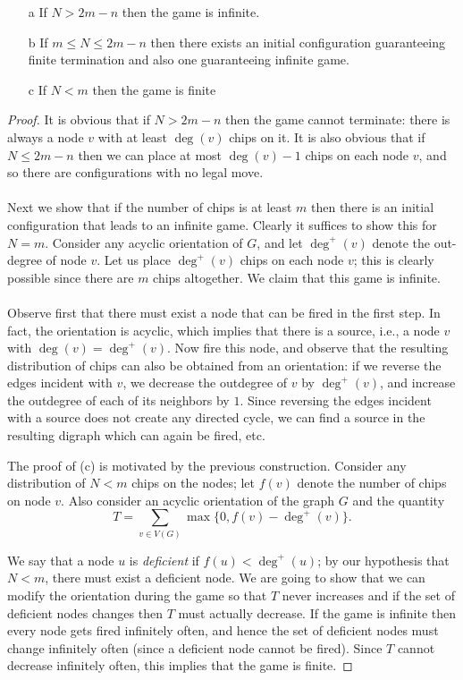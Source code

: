 \sol 

\begin{itemize}
    \item[a] If $N > 2m - n$ then the game is infinite.
    \item[b] If $m \leq N \leq 2m - n$ then there exists an initial configuration guaranteeing finite termination and also one guaranteeing infinite game.
    \item[c] If $N < m$ then the game is finite
\end{itemize}

\begin{proof}
It is obvious that if $N > 2m-n$ then the game cannot terminate: there is always a node $v$ with at least $\deg(v)$ chips on it. It is also obvious that if $N \leq 2m-n$ then we can place at most $\deg(v)-1$ chips on each node $v$, and so there are configurations with no legal move.
\\\\
Next we show that if the number of chips is at least $m$ then there is an initial configuration that leads to an infinite game. Clearly it suffices to show this for $N=m$. Consider any acyclic orientation of $G$, and let $\deg^+(v)$ denote the out-degree of node $v$. Let us place $\deg^+(v)$ chips on each node $v$; this is clearly possible since there are $m$ chips altogether. We claim that this game is infinite.
\\\\
Observe first that there must exist a node that can be fired in the first step. In fact, the orientation is acyclic, which implies that there is a source, i.e., a node $v$ with $\deg(v) = \deg^+(v)$. Now fire this node, and observe that the resulting distribution of chips can also be obtained from an orientation: if we reverse the edges incident with $v$, we decrease the outdegree of $v$ by $\deg^+(v)$, and increase the outdegree of each of its neighbors by $1$. Since reversing the edges incident with a source does not create any directed cycle, we can find a source in the resulting digraph which can again be fired, etc.

The proof of (c) is motivated by the previous construction. Consider any distribution of $N < m$ chips on the nodes; let $f(v)$ denote the number of chips on node $v$. Also consider an acyclic orientation of the graph $G$ and the quantity
\[
T = \sum_{v \in V(G)} \max \{ 0, f(v) - \deg^+(v) \}.
\]

We say that a node $u$ is \emph{deficient} if $f(u) < \deg^+(u)$; by our hypothesis that $N < m$, there must exist a deficient node. We are going to show that we can modify the orientation during the game so that $T$ never increases and if the set of deficient nodes changes then $T$ must actually decrease. If the game is infinite then every node gets fired infinitely often, and hence the set of deficient nodes must change infinitely often (since a deficient node cannot be fired). Since $T$ cannot decrease infinitely often, this implies that the game is finite.


\end{proof}
